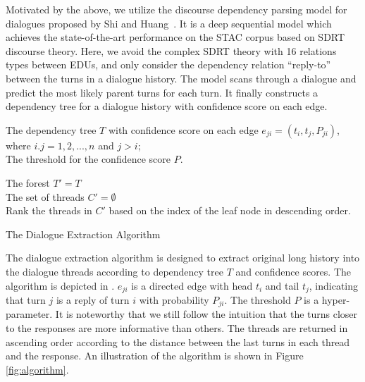 Motivated by the above, we utilize the discourse dependency parsing model for dialogues proposed by Shi and Huang~. It is a deep sequential model which achieves the state-of-the-art performance on the STAC corpus based on SDRT discourse theory. Here, we avoid the complex SDRT theory with 16 relations types between EDUs, and only consider the dependency relation ``reply-to'' between the turns in a dialogue history. 
The model scans through a dialogue and predict the most likely parent turns for each turn. 
It finally constructs a dependency tree for a dialogue history with confidence score 
on each edge.

\begin{algorithm}
	\scriptsize
	\SetAlgoNoLine 
	
	\Input
	{
		The dependency tree $T$ with confidence score on each edge $e_{ji}=(t_i, t_j, P_{ji})$, where $i.j=1, 2, ..., n$ and $j>i$;\\
		The threshold for the confidence score $P$.
	}
	\BlankLine
	
	The forest $T' = T$\\
	The set of threads $C'=\emptyset$\\
	Rank the threads in $C'$ based on the index of the leaf node in descending order.
	
	\caption{The Dialogue Extraction Algorithm\label{alg:A}}
	\label{alg:DSA}
\end{algorithm}


The dialogue extraction algorithm is designed to extract original long history into the dialogue threads according to dependency tree $T$ and confidence scores. The algorithm is 
depicted in . $e_{ji}$ is a directed edge with head $t_i$ and tail $t_j$, 
indicating that turn $j$ is a reply of turn $i$ with probability $P_{ji}$.
The threshold $P$ is a hyper-parameter. It is noteworthy that we still follow the intuition 
that the turns closer to the responses are more informative than others. 
The threads are returned in ascending order according to the distance between 
the last turns in each thread and the response. 
An illustration of the algorithm is shown in Figure \ref{fig:algorithm}.


